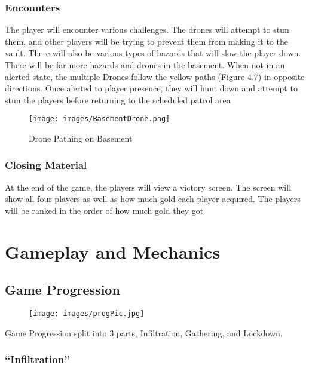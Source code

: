 \documentclass[10pt]{report}
\begin{document}
\subsection{Encounters}

The player will encounter various challenges. The drones will attempt to stun them, and other players will be trying to prevent them from making it to the vault. There will also be various types of hazards that will slow the player down. There will be far more hazards and drones in the basement. When not in an alerted state, the multiple Drones follow the yellow paths (Figure 4.7) in opposite directions. Once alerted to player presence, they will hunt down and attempt to stun the players before returning to the scheduled patrol area

\begin{figure}[H]
    \centering
    \texttt{[image: images/BasementDrone.png]}
    \caption{Drone Pathing on Basement}
\end{figure}

\subsection{Closing Material}

At the end of the game, the players will view a victory screen. The screen will show all four players as well as how much gold each player acquired. The players will be ranked in the order of how much gold they got

\chapter{Gameplay and Mechanics}

\section{Game Progression}

\begin{figure}
    \texttt{[image: images/progPic.jpg]}
    \caption{}
\end{figure}

Game Progression split into 3 parts, Infiltration, Gathering, and Lockdown.

\subsection{``Infiltration''}
\end{document}
